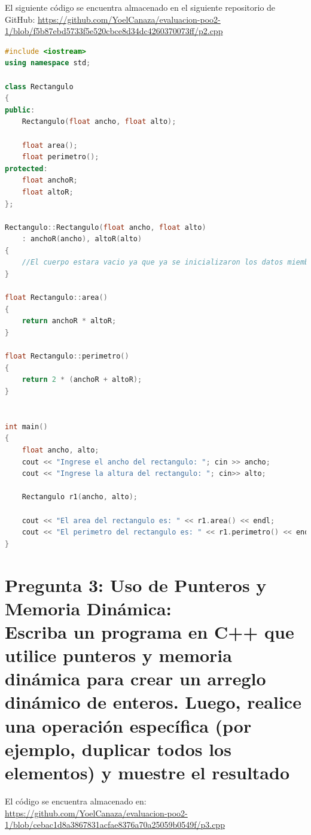 \documentclass[11pt,a4paper]{article}
\begin{document}
El siguiente código se encuentra almacenado en el siguiente repositorio de GitHub: \url{https://github.com/YoelCanaza/evaluacion-poo2-1/blob/f5b87ebd5733f5e520cbce8d34dc4260370073ff/p2.cpp}

\begin{lstlisting}[language=C++, style=mystyle, caption={Implementación de clases en C++}]
#include <iostream>
using namespace std;

class Rectangulo
{
public:
    Rectangulo(float ancho, float alto);

    float area();
    float perimetro();
protected:
    float anchoR;
    float altoR;
};

Rectangulo::Rectangulo(float ancho, float alto)
    : anchoR(ancho), altoR(alto)
{
    //El cuerpo estara vacio ya que ya se inicializaron los datos miembro
}

float Rectangulo::area()
{
    return anchoR * altoR;
}

float Rectangulo::perimetro()
{
    return 2 * (anchoR + altoR);
}


int main()
{
    float ancho, alto;
    cout << "Ingrese el ancho del rectangulo: "; cin >> ancho;
    cout << "Ingrese la altura del rectangulo: "; cin>> alto;

    Rectangulo r1(ancho, alto);

    cout << "El area del rectangulo es: " << r1.area() << endl;
    cout << "El perimetro del rectangulo es: " << r1.perimetro() << endl;
}
\end{lstlisting}


\section{Pregunta 3: Uso de Punteros y Memoria Dinámica: \\ Escriba un programa en C++ que utilice punteros y memoria dinámica para crear un arreglo dinámico de enteros. Luego, realice una operación específica (por ejemplo, duplicar todos los elementos) y muestre el resultado}

El código se encuentra almacenado en: \url{https://github.com/YoelCanaza/evaluacion-poo2-1/blob/cebac1d8a3867831acfae8376a70a25059b0549f/p3.cpp}
\end{document}
